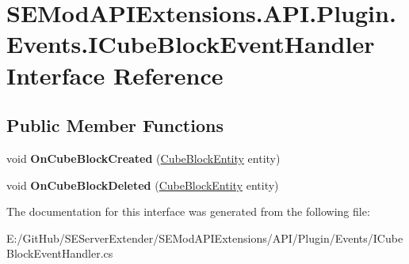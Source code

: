 \hypertarget{interface_s_e_mod_a_p_i_extensions_1_1_a_p_i_1_1_plugin_1_1_events_1_1_i_cube_block_event_handler}{}\section{S\+E\+Mod\+A\+P\+I\+Extensions.\+A\+P\+I.\+Plugin.\+Events.\+I\+Cube\+Block\+Event\+Handler Interface Reference}
\label{interface_s_e_mod_a_p_i_extensions_1_1_a_p_i_1_1_plugin_1_1_events_1_1_i_cube_block_event_handler}
\subsection*{Public Member Functions}
\begin{DoxyCompactItemize}
\item 
\hypertarget{interface_s_e_mod_a_p_i_extensions_1_1_a_p_i_1_1_plugin_1_1_events_1_1_i_cube_block_event_handler_ae5e4c7864d952eb4adacf3a4f724c152}{}void {\bfseries On\+Cube\+Block\+Created} (\hyperlink{class_s_e_mod_a_p_i_internal_1_1_a_p_i_1_1_entity_1_1_sector_1_1_sector_object_1_1_cube_grid_1_1_cube_block_entity}{Cube\+Block\+Entity} entity)\label{interface_s_e_mod_a_p_i_extensions_1_1_a_p_i_1_1_plugin_1_1_events_1_1_i_cube_block_event_handler_ae5e4c7864d952eb4adacf3a4f724c152}

\item 
\hypertarget{interface_s_e_mod_a_p_i_extensions_1_1_a_p_i_1_1_plugin_1_1_events_1_1_i_cube_block_event_handler_a8e37081e52c25a8828d8d749b3ef8914}{}void {\bfseries On\+Cube\+Block\+Deleted} (\hyperlink{class_s_e_mod_a_p_i_internal_1_1_a_p_i_1_1_entity_1_1_sector_1_1_sector_object_1_1_cube_grid_1_1_cube_block_entity}{Cube\+Block\+Entity} entity)\label{interface_s_e_mod_a_p_i_extensions_1_1_a_p_i_1_1_plugin_1_1_events_1_1_i_cube_block_event_handler_a8e37081e52c25a8828d8d749b3ef8914}

\end{DoxyCompactItemize}


The documentation for this interface was generated from the following file\+:\begin{DoxyCompactItemize}
\item 
E\+:/\+Git\+Hub/\+S\+E\+Server\+Extender/\+S\+E\+Mod\+A\+P\+I\+Extensions/\+A\+P\+I/\+Plugin/\+Events/I\+Cube\+Block\+Event\+Handler.\+cs\end{DoxyCompactItemize}
